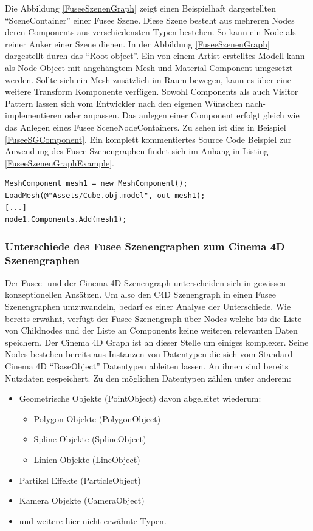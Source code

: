 \documentclass[pagesize, paper=a4, fontsize=12pt, titlepage=true, headings=small, headnosepline, abstractoff, liststotoc, nochapterprefix, plainheadsepline, twoside]{scrreprt}
\begin{document}
Die Abbildung \ref{FuseeSzenenGraph} zeigt einen Beispielhaft dargestellten “SceneContainer” einer Fusee Szene. Diese Szene besteht aus mehreren Nodes deren Components aus verschiedensten Typen bestehen. So kann ein Node als reiner Anker einer Szene dienen. In der Abbildung \ref{FuseeSzenenGraph} dargestellt durch das “Root object”. Ein von einem Artist erstelltes Modell kann als Node Object mit angehängtem Mesh und Material Component umgesetzt werden. Sollte sich ein Mesh zusätzlich im Raum bewegen, kann es über eine weitere Transform Komponente verfügen. Sowohl Components als auch Visitor Pattern lassen sich vom Entwickler nach den eigenen Wünschen nach-implementieren oder anpassen. Das anlegen einer Component erfolgt gleich wie das Anlegen eines Fusee SceneNodeContainers. Zu sehen ist dies in Beispiel \ref{FuseeSGComponent}. Ein komplett kommentiertes Source Code Beispiel zur Anwendung des Fusee Szenengraphen findet sich im Anhang in Listing \ref{FuseeSzenenGraphExample}.

\begin{lstlisting}[caption = Erstellen einer Component aus einem Mesh Objekt und Anhängen an einen Fusee SceneNodeContainer., label=FuseeSGComponent]
MeshComponent mesh1 = new MeshComponent();
LoadMesh(@"Assets/Cube.obj.model", out mesh1);
[...]
node1.Components.Add(mesh1);
\end{lstlisting}

\subsubsection{Unterschiede des Fusee Szenengraphen zum Cinema 4D Szenengraphen}
Der Fusee- und der Cinema 4D Szenengraph unterscheiden sich in gewissen konzeptionellen Ansätzen. Um also den C4D Szenengraph in einen Fusee Szenengraphen umzuwandeln, bedarf es einer Analyse der Unterschiede.
Wie bereits erwähnt, verfügt der Fusee Szenengraph über Nodes welche bis die Liste von Childnodes und der Liste an Components keine weiteren relevanten Daten speichern. Der Cinema 4D Graph ist an dieser Stelle um einiges komplexer. Seine Nodes bestehen bereits aus Instanzen von Datentypen die sich vom Standard Cinema 4D “BaseObject” Datentypen ableiten lassen. An ihnen sind bereits Nutzdaten gespeichert. Zu den möglichen Datentypen zählen unter anderem:
\begin{itemize}
\item Geometrische Objekte (PointObject) davon abgeleitet wiederum:
	\begin{itemize}
	\item Polygon Objekte (PolygonObject)
	\item Spline Objekte (SplineObject)
	\item Linien Objekte (LineObject)
	\end{itemize}
\item Partikel Effekte (ParticleObject)
\item Kamera Objekte (CameraObject)
\item und weitere hier nicht erwähnte Typen.
\end{itemize}
\end{document}
